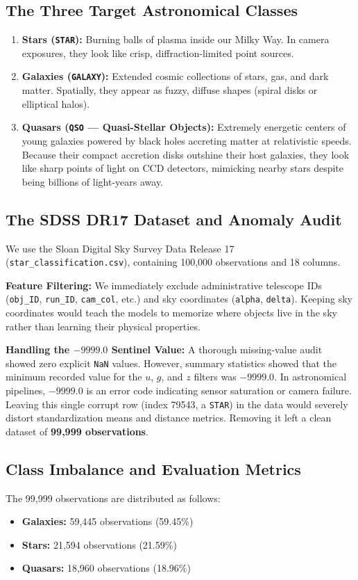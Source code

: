 \documentclass[11pt,a4paper]{article}
\begin{document}
\subsection{The Three Target Astronomical Classes}
\begin{enumerate}[noitemsep]
    \item \textbf{Stars (\texttt{STAR}):} Burning balls of plasma inside our Milky Way. In camera exposures, they look like crisp, diffraction-limited point sources.
    \item \textbf{Galaxies (\texttt{GALAXY}):} Extended cosmic collections of stars, gas, and dark matter. Spatially, they appear as fuzzy, diffuse shapes (spiral disks or elliptical halos).
    \item \textbf{Quasars (\texttt{QSO} --- Quasi-Stellar Objects):} Extremely energetic centers of young galaxies powered by black holes accreting matter at relativistic speeds. Because their compact accretion disks outshine their host galaxies, they look like sharp points of light on CCD detectors, mimicking nearby stars despite being billions of light-years away.
\end{enumerate}

\subsection{The SDSS DR17 Dataset and Anomaly Audit}
We use the Sloan Digital Sky Survey Data Release 17 (\texttt{star\_classification.csv}), containing 100,000 observations and 18 columns. 

\textbf{Feature Filtering:} We immediately exclude administrative telescope IDs (\texttt{obj\_ID}, \texttt{run\_ID}, \texttt{cam\_col}, etc.) and sky coordinates (\texttt{alpha}, \texttt{delta}). Keeping sky coordinates would teach the models to memorize where objects live in the sky rather than learning their physical properties.

\textbf{Handling the $-9999.0$ Sentinel Value:} A thorough missing-value audit showed zero explicit \texttt{NaN} values. However, summary statistics showed that the minimum recorded value for the $u$, $g$, and $z$ filters was $-9999.0$. In astronomical pipelines, $-9999.0$ is an error code indicating sensor saturation or camera failure. Leaving this single corrupt row (index 79543, a \texttt{STAR}) in the data would severely distort standardization means and distance metrics. Removing it left a clean dataset of \textbf{99,999 observations}.

\subsection{Class Imbalance and Evaluation Metrics}
The 99,999 observations are distributed as follows:
\begin{itemize}[noitemsep]
    \item \textbf{Galaxies:} 59,445 observations (59.45\%)
    \item \textbf{Stars:} 21,594 observations (21.59\%)
    \item \textbf{Quasars:} 18,960 observations (18.96\%)
\end{itemize}
\end{document}
